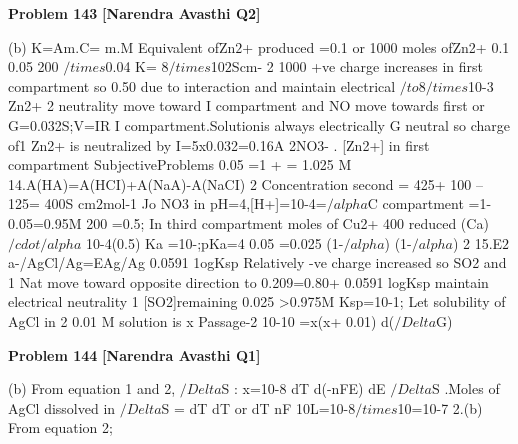 \begin{problembox}
\textbf{Problem 143} \hfill \textbf{[Narendra Avasthi Q2]}
\label{q:ext-narendra_avasthi_all_questions-143}

(b) K=Am.C=
m.M
Equivalent ofZn$2$+ produced =0.1 or
1000
moles ofZn2+\underline{\hspace{1cm}} 0.1
0.05
200 $/times$0.04
K=
8$/times$10$2$Scm-
2
1000
+ve charge increases in first compartment so
0.50
due to interaction and maintain electrical
$/to$8$/times$10-3
Zn2+
2
neutrality
move
toward
 I
compartment and NO move towards first
or G=0.032S;V=IR
I
compartment.Solutionis always electrically
G
neutral so charge of1 Zn2+ is neutralized by
I=5x0.032=0.16A
2NO3-
. [Zn2+] in first compartment
SubjectiveProblems
0.05
=1 +
= 1.025 M
14.A(HA)=A(HCI)+A(NaA)-A(NaCI)
2
Concentration
second
= 425+ 100 --125= 400S cm$2$mol-1
Jo
NO3
in
pH=4,[H+]=10-4=$/alpha$C
compartment
=1-0.05=0.95M
200
=0.5;
In third
compartment moles of Cu2+
400
reduced
(Ca)$/cdot$$/alpha$
10-4(0.5)
Ka
=10-;pKa=4
0.05
=0.025
(1-$/alpha$)
(1-$/alpha$)
2
15.E$2$a-/AgCl/Ag=EAg/Ag
0.0591
1ogKsp
Relatively -ve charge increased so SO2 and
1
Nat move toward opposite direction to
0.209=0.80+
0.0591
logKsp
maintain electrical neutrality
1
[SO2]remaining
0.025
>0.975M
Ksp=10-1; Let solubility of AgCl in
2
0.01 M solution is x
Passage-2
10-10 =x(x+ 0.01)
d($/Delta$G)
\end{problembox}

\begin{problembox}
\textbf{Problem 144} \hfill \textbf{[Narendra Avasthi Q1]}
\label{q:ext-narendra_avasthi_all_questions-144}

(b) From equation 1 and 2, $/Delta$S :
x=10-8
dT
d(-nFE)
dE
$/Delta$S
.Moles of AgCl dissolved in
$/Delta$S =
dT
dT
or
dT
nF
10L=10-8$/times$10=10-7
2.(b) From equation 2;
\end{problembox}